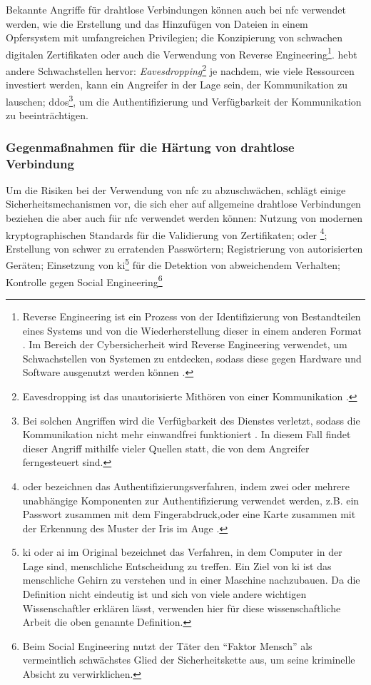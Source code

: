 Bekannte Angriffe für drahtlose Verbindungen können auch bei \acrshort{nfc} verwendet werden\cite{refip:NYRS}, wie die
Erstellung und das Hinzufügen von Dateien in einem Opfersystem mit umfangreichen Privilegien; die Konzipierung
von schwachen digitalen Zertifikaten oder auch die Verwendung von Reverse Engineering\footnote{Reverse
Engineering ist ein Prozess von der Identifizierung von Bestandteilen eines Systems und von die Wiederherstellung 
dieser in einem anderen Format \cite{refart:CHRE}. Im Bereich der Cybersicherheit wird Reverse Engineering 
verwendet, um Schwachstellen von Systemen zu entdecken, sodass diese gegen Hardware und Software ausgenutzt
werden können \cite{refip:CMBM}.}. \cite{refart:ALSI} hebt andere Schwachstellen hervor: 
\textit{Eavesdropping}\footnote{Eavesdropping ist das unautorisierte Mithören von einer Kommunikation 
\cite{refbook:SWIS}.} je nachdem, wie viele Ressourcen investiert werden, kann ein Angreifer in der 
Lage sein, der Kommunikation zu lauschen; \acrfull{ddos}\footnote{Bei solchen Angriffen wird die
Verfügbarkeit des Dienstes verletzt, sodass die Kommunikation nicht mehr einwandfrei funktioniert \cite{refbook:SWIS}. 
In diesem Fall findet dieser Angriff mithilfe vieler Quellen statt, die von dem Angreifer ferngesteuert sind.},
um die Authentifizierung und Verfügbarkeit der Kommunikation zu beeinträchtigen.


\subsubsection{Gegenmaßnahmen für die Härtung von drahtlose Verbindung}

Um die Risiken bei der Verwendung von \acrshort{nfc} zu abzuschwächen, schlägt \cite{refip:NYRS} einige Sicherheitsmechanismen vor, 
die sich eher auf allgemeine drahtlose Verbindungen beziehen die aber auch für \acrshort{nfc} verwendet werden können: Nutzung
von modernen kryptographischen Standards für die Validierung von Zertifikaten;  oder \footnote{ oder  bezeichnen das Authentifizierungsverfahren, indem zwei oder mehrere 
unabhängige Komponenten zur Authentifizierung verwendet werden, z.B. ein Passwort zusammen mit dem Fingerabdruck,oder eine Karte 
zusammen mit der Erkennung des Muster der Iris im Auge \cite{refip:simf}.}; Erstellung von schwer zu erratenden Passwörtern;
Registrierung von autorisierten Geräten; Einsetzung von \acrlong{ki}\footnote{\acrlong{ki} oder \acrlong{ai} im Original
bezeichnet das Verfahren, in dem Computer in der Lage sind, menschliche Entscheidung zu treffen\cite{refart:HAKI}. Ein Ziel
von \acrshort{ki} ist das menschliche Gehirn zu verstehen und in einer Maschine nachzubauen. Da die Definition nicht eindeutig 
ist und sich von viele andere wichtigen Wissenschaftler erklären lässt, verwenden hier für diese wissenschaftliche Arbeit die oben
genannte Definition.} für die Detektion von abweichendem Verhalten; Kontrolle gegen Social Engineering\footnote{Beim Social Engineering 
nutzt der Täter den ``Faktor Mensch'' als vermeintlich schwächstes Glied der Sicherheitskette aus, um seine kriminelle Absicht zu 
verwirklichen.\cite{booklet:BSSE}}

